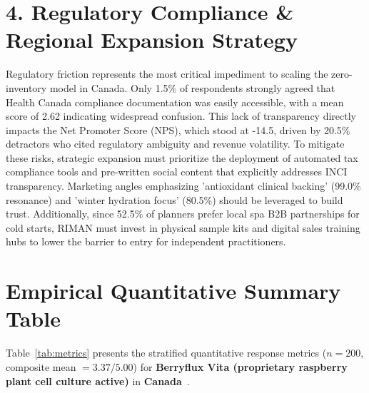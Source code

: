 \documentclass[10pt,twocolumn,a4paper]{article}
\begin{document}
\section{4. Regulatory Compliance \& Regional Expansion Strategy}
Regulatory friction represents the most critical impediment to scaling the zero-inventory model in Canada. Only 1.5\% of respondents strongly agreed that Health Canada compliance documentation was easily accessible, with a mean score of 2.62 indicating widespread confusion. This lack of transparency directly impacts the Net Promoter Score (NPS), which stood at -14.5, driven by 20.5\% detractors who cited regulatory ambiguity and revenue volatility. To mitigate these risks, strategic expansion must prioritize the deployment of automated tax compliance tools and pre-written social content that explicitly addresses INCI transparency. Marketing angles emphasizing 'antioxidant clinical backing' (99.0\% resonance) and 'winter hydration focus' (80.5\%) should be leveraged to build trust. Additionally, since 52.5\% of planners prefer local spa B2B partnerships for cold starts, RIMAN must invest in physical sample kits and digital sales training hubs to lower the barrier to entry for independent practitioners.


\section{Empirical Quantitative Summary Table}
Table~\ref{tab:metrics} presents the stratified quantitative response metrics ($n = 200$, composite mean $= 3.37/5.00$) for \textbf{Berryflux Vita (proprietary raspberry plant cell culture active)} in \textbf{Canada}~\cite{ref_kaggle_doi,ref_hf_doi}.
\end{document}
